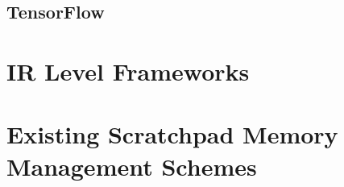 
\subsection{TensorFlow}


\section{IR Level Frameworks}



\section{Existing Scratchpad Memory Management Schemes}
%

